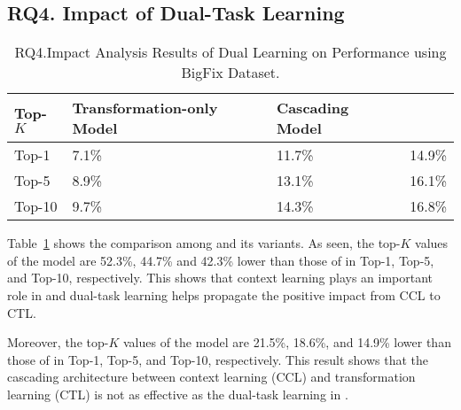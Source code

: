 \subsection{\bf RQ4. Impact of Dual-Task Learning}



\begin{table}[t]
  \caption{RQ4.Impact Analysis Results of Dual Learning on Performance using BigFix Dataset.}
  \vspace{-6pt}
	{\footnotesize
		\begin{center}
			\renewcommand{\arraystretch}{1}
			\begin{tabular}{p{1cm}<{\centering}|p{2.7cm}<{\centering}|p{1.7cm}<{\centering}|p{1cm}<{\centering}}
				\hline
				Top-$K$ & Transformation-only Model & Cascading Model &  \tool \\			
				\hline
				Top-1   & 7.1\% & 11.7\% & 14.9\% \\ \hline
				Top-5	& 8.9\% & 13.1\% & 16.1\% \\ \hline
				Top-10	& 9.7\% & 14.3\% & 16.8\%\\ \hline
			
				\hline
			\end{tabular}
			\label{fig:rq4_results}
		\end{center}
	}
\end{table}

Table~\ref{fig:rq4_results} shows the comparison among {\tool} and its
variants. As seen, the top-$K$ values of the
 model are 52.3\%, 44.7\% and 42.3\% lower
than those of {\tool} in Top-1, Top-5, and Top-10, respectively. This
shows that context learning plays an important role in {\tool} and
dual-task learning helps propagate the positive impact from CCL to
CTL.


Moreover, the top-$K$ values of the  model are 21.5\%,
18.6\%, and 14.9\% lower than those of {\tool} in Top-1, Top-5, and
Top-10, respectively. This result shows that the cascading
architecture between context learning (CCL) and transformation
learning (CTL) is not as effective as the dual-task learning
in {\tool}.

